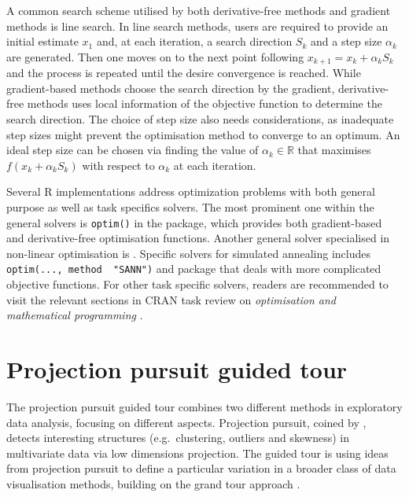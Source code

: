 A common search scheme utilised by both derivative-free methods and
gradient methods is line search. In line search methods, users are
required to provide an initial estimate \(x_{1}\) and, at each
iteration, a search direction \(S_k\) and a step size \(\alpha_k\) are
generated. Then one moves on to the next point following
\(x_{k+1} = x_k + \alpha_kS_k\) and the process is repeated until the
desire convergence is reached. While gradient-based methods choose the
search direction by the gradient, derivative-free methods uses local
information of the objective function to determine the search direction.
The choice of step size also needs considerations, as inadequate step
sizes might prevent the optimisation method to converge to an optimum.
An ideal step size can be chosen via finding the value of
\(\alpha_k \in \mathbb{R}\) that maximises \(f(x_k + \alpha_kS_k)\) with
respect to \(\alpha_k\) at each iteration.

Several R implementations address optimization problems with both
general purpose as well as task specifics solvers. The most prominent
one within the general solvers is \texttt{optim()} in the
 \citep{stats} package, which provides both
gradient-based and derivative-free optimisation functions. Another
general solver specialised in non-linear optimisation is
 \citep{nloptr}. Specific solvers for simulated
annealing includes \texttt{optim(...,\ method\ \ "SANN")} and package
 \citep{gensa} that deals with more complicated objective
functions. For other task specific solvers, readers are recommended to
visit the relevant sections in CRAN task review on \emph{optimisation
and mathematical programming} \citep{crantaskreviewoptim}.

\hypertarget{tour}{%
\section{Projection pursuit guided tour}\label{tour}}

The projection pursuit guided tour combines two different methods in
exploratory data analysis, focusing on different aspects. Projection
pursuit, coined by \citet{friedman1974projection}, detects interesting
structures (e.g.~clustering, outliers and skewness) in multivariate data
via low dimensions projection. The guided tour is using ideas from
projection pursuit to define a particular variation in a broader class
of data visualisation methods, building on the grand tour approach
\citep{As85}.

